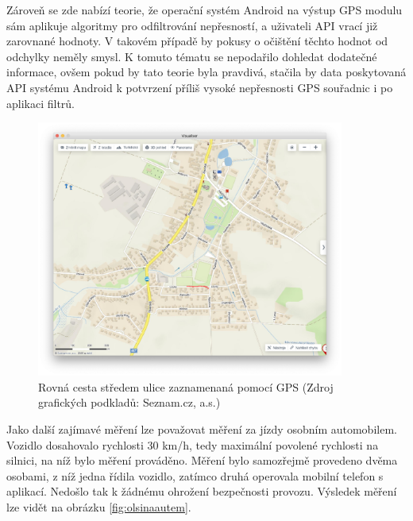 \documentclass[czech, bachelor]{diploma}
\begin{document}
Zároveň se zde nabízí teorie, že operační systém Android na výstup GPS modulu sám aplikuje algoritmy pro odfiltrování nepřesností,
a uživateli API vrací již zarovnané hodnoty. V takovém případě by pokusy o očištění těchto hodnot od odchylky neměly smysl.
K tomuto tématu se nepodařilo dohledat dodatečné informace, ovšem pokud by tato teorie byla pravdivá, stačila by data poskytovaná
API systému Android k potvrzení příliš vysoké nepřesnosti GPS souřadnic i po aplikaci filtrů.

\begin{figure}
    \centering
    \includegraphics[width=0.9\textwidth]{Figures/louky.png}
    \caption{Rovná cesta středem ulice zaznamenaná pomocí GPS (Zdroj grafických podkladů: Seznam.cz, a.s.)}
    \label{fig:louky}
\end{figure}

Jako další zajímavé měření lze považovat měření za jízdy osobním automobilem. Vozidlo dosahovalo rychlosti 30 km/h, tedy maximální
povolené rychlosti na silnici, na níž bylo měření prováděno. Měření bylo samozřejmě provedeno dvěma osobami, z níž jedna řídila
vozidlo, zatímco druhá operovala mobilní telefon s aplikací. Nedošlo tak k žádnému ohrožení bezpečnosti provozu. Výsledek měření
lze vidět na obrázku \ref{fig:olsinaautem}.
\end{document}
